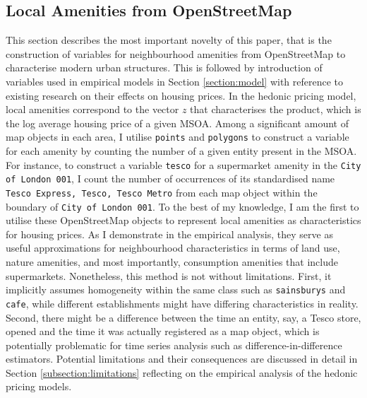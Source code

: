 \documentclass{article}
\begin{document}
\subsection{Local Amenities from OpenStreetMap}
This section describes the most important novelty of this paper, that is the construction of variables for neighbourhood amenities from OpenStreetMap to characterise modern urban structures. This is followed by introduction of variables used in empirical models in Section \ref{section:model} with reference to existing research on their effects on housing prices. In the hedonic pricing model, local amenities correspond to the vector $z$ that characterises the product, which is the log average housing price of a given MSOA. Among a significant amount of map objects in each area, I utilise \texttt{points} and \texttt{polygons} to construct a variable for each amenity by counting the number of a given entity present in the MSOA. For instance, to construct a variable \texttt{tesco} for a supermarket amenity in the \texttt{City of London 001}, I count the number of occurrences of its standardised name \texttt{Tesco Express, Tesco, Tesco Metro} from each map object within the boundary of \texttt{City of London 001}. To the best of my knowledge, I am the first to utilise these OpenStreetMap objects to represent local amenities as characteristics for housing prices. As I demonstrate in the empirical analysis, they serve as useful approximations for neighbourhood characteristics in terms of land use, nature amenities, and most importantly, consumption amenities that include supermarkets. Nonetheless, this method is not without limitations. First, it implicitly assumes homogeneity within the same class such as \texttt{sainsburys} and \texttt{cafe}, while different establishments might have differing characteristics in reality. Second, there might be a difference between the time an entity, say, a Tesco store, opened and the time it was actually registered as a map object, which is potentially problematic for time series analysis such as difference-in-difference estimators. Potential limitations and their consequences are discussed in detail in Section \ref{subsection:limitations} reflecting on the empirical analysis of the hedonic pricing models. 
\end{document}
